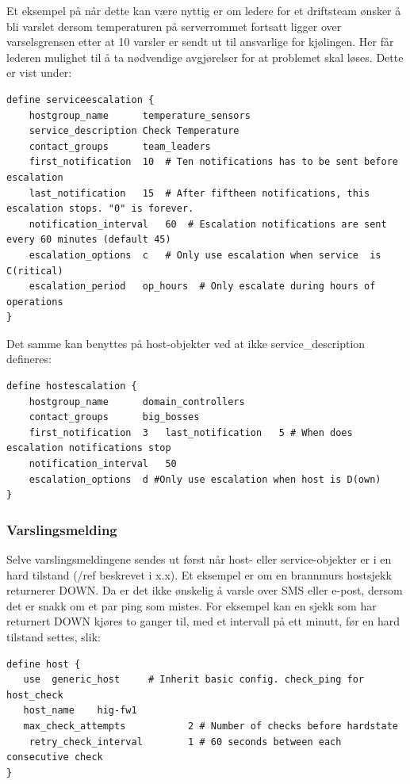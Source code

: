 Et eksempel på når dette kan være nyttig er om ledere for et driftsteam ønsker å bli varslet dersom temperaturen på serverrommet fortsatt ligger over varselsgrensen etter at 10 varsler er sendt ut til ansvarlige for kjølingen. Her får lederen mulighet til å ta nødvendige avgjørelser for at problemet skal løses. Dette er vist under:
\begin{lstlisting}
define serviceescalation {
	hostgroup_name		temperature_sensors
	service_description	Check Temperature
	contact_groups		team_leaders
	first_notification	10	# Ten notifications has to be sent before escalation
	last_notification	15	# After fiftheen notifications, this escalation stops. "0" is forever.
	notification_interval	60 	# Escalation notifications are sent every 60 minutes (default 45)
	escalation_options	c	# Only use escalation when service  is C(ritical)
	escalation_period	op_hours  # Only escalate during hours of operations
}
\end{lstlisting}
Det samme kan benyttes på host-objekter ved at ikke service\_description defineres:
\begin{lstlisting}
define hostescalation {
	hostgroup_name		domain_controllers
	contact_groups		big_bosses
	first_notification	3 	last_notification	5 # When does escalation notifications stop
	notification_interval	50
	escalation_options	d #Only use escalation when host is D(own)
}
\end{lstlisting}

\subsubsection{Varslingsmelding}

Selve varslingsmeldingene sendes ut først når host- eller service-objekter er i en hard tilstand (/ref beskrevet i x.x). Et eksempel er om en brannmurs hostsjekk returnerer DOWN. Da er det ikke ønskelig å varsle over SMS eller e-post, dersom det er snakk om et par ping som mistes. For eksempel kan en sjekk som har returnert DOWN kjøres to ganger til, med et intervall på ett minutt, før en hard tilstand settes, slik:

\begin{lstlisting}
define host {
   use 	generic_host     # Inherit basic config. check_ping for host_check
   host_name	hig-fw1
   max_check_attempts           2 # Number of checks before hardstate
    retry_check_interval        1 # 60 seconds between each consecutive check
}
\end{lstlisting}

